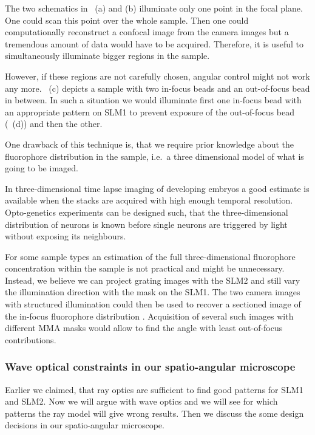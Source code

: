 The two schematics in ~(a) and (b)
illuminate only one point in the focal plane. One could scan this
point over the whole sample. Then one could computationally
reconstruct a confocal image from the camera images but a tremendous
amount of data would have to be acquired. Therefore, it is useful to
simultaneously illuminate bigger regions in the sample.

However, if these regions are not carefully chosen, angular control
might not work any more. ~(c) depicts a
sample with two in-focus beads and an out-of-focus bead in between. In
such a situation we would illuminate first one in-focus bead with an
appropriate pattern on SLM1 to prevent exposure of the out-of-focus
bead (~(d)) and then the other. 

One drawback of this technique is, that we require prior knowledge
about the fluorophore distribution in the sample, i.e.\ a three
dimensional model of what is going to be imaged.

In three-dimensional time lapse imaging of developing embryos a good
estimate is available when the stacks are acquired with high enough
temporal resolution. Opto-genetics experiments can be designed such,
that the three-dimensional distribution of neurons is known before
single neurons are triggered by light without exposing its neighbours.

For some sample types an estimation of the full three-dimensional
fluorophore concentration within the sample is not practical and might
be unnecessary. Instead, we believe we can project grating images with
the SLM2 and still vary the illumination direction with the mask on
the SLM1. The two camera images with structured illumination could then
be used to recover a sectioned image of the in-focus fluorophore
distribution \citep{2008Lim,Bozinovic2008,2009Santos}. Acquisition of
several such images with different MMA masks would allow to find the
angle with least out-of-focus contributions.


\subsubsection{Wave optical constraints in our spatio-angular microscope}
\label{sec:wave-constraints}
Earlier we claimed, that ray optics are sufficient to find good
patterns for SLM1 and SLM2. Now we will argue with wave optics and we
will see for which patterns the ray model will give wrong
results. Then we discuss the some design decisions in our
spatio-angular microscope.

